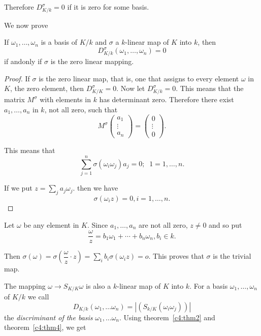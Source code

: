 Therefore $D_{ K /k}^\sigma = 0$ if it is zero for some basis.

We now prove 

\begin{thm}\label{c4:thm4}%
 If $\omega _1 , \ldots , \omega_n$  is a basis of $K/k$ and
   $\sigma $ a $k$-linear map of $K$ into $k$, then  
 $$
 D^\sigma_{ K/k} (\omega_1 , \ldots, \omega_n ) = 0 
 $$
if and\pageoriginale only if $\sigma$ is the zero linear mapping.  
\end{thm}

\begin{proof}
If $\sigma$ is the zero linear map, that is, one that assigns to
every element $\omega$ in $K$, the zero element, then $D_{K/K}^\sigma
= 0 $. Now let $D_{K/k}^\sigma = 0$. This means that the matrix
$M^{\sigma}$ with elements in $k$ has determinant zero. Therefore there
exist $a_1, \ldots, a_n$ in $k$, not all zero, such that  
$$
M^\sigma \begin{pmatrix}  a_ 1 \\ \vdots \\ a_n \end{pmatrix}
=  \begin{pmatrix}  0 \\ \vdots \\ 0 \end{pmatrix} .  
$$

This means that 
$$
\sum^n_{ j = 1} \sigma (\omega_i \omega_j )a_j = 0 ; \;\; 1=1, \ldots , n .  
$$

If we put $z = \sum\limits_j a_j \omega_j $. then we have  
$$
\sigma (\omega _i z ) =  0 , i = 1 , \ldots , n . 
$$
\end{proof}

Let $\omega$ be any element in $K$. Since $a_1 , \ldots , a_n$ are not
all zero, $z \neq 0$ and so put  
$$
\frac{\omega}{z} = b_1 \omega_1 + \cdots + b_n \omega_n,  b_i \in k. 
$$

Then $\sigma (\omega) = \sigma \left(\dfrac{\omega}{z} \cdot z \right) 
= \sum\limits_i b_i \sigma (\omega _i z) = o $. This proves that
$\sigma$ is the trivial 
map.  

The mapping $\omega \to S_{K/K} \omega $ is also a $k$-linear map of $K$ 
into $k$. For a basis $\omega_1 , \ldots, \omega_n$ of $K/k$ we call  
$$
D_{K/k}(\omega_1 , \ldots \omega_n) = | (S_{k /K} (\omega _i \omega_j)) | 
$$
the \textit{discriminant of the basis} $\omega _1 , \ldots
\omega_n$. Using theorem~\ref{c4:thm2} and theorem~\ref{c4:thm4}, we get   

